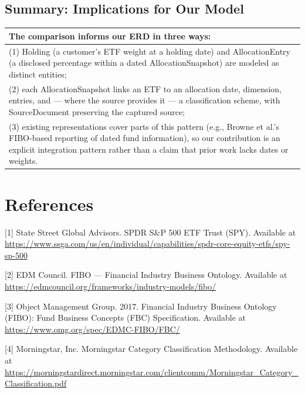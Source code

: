 \documentclass[sigconf]{acmart}
\begin{document}
\subsection{Summary: Implications for Our Model}

\begin{table}[h]
\centering
\begin{tabular}{p{}}
\toprule
The comparison informs our ERD in three ways:\\
\midrule
(1) Holding (a customer's ETF weight at a holding date) and
AllocationEntry (a disclosed percentage within a dated AllocationSnapshot)
are modeled as distinct entities;\\
(2) each AllocationSnapshot links an ETF to an allocation date, dimension,
entries, and --- where the source provides it --- a classification scheme,
with SourceDocument preserving the captured source;\\
(3) existing representations cover parts of this pattern (e.g., Browne et
al.'s FIBO-based reporting of dated fund information), so our contribution
is an explicit integration pattern rather than a claim that prior work
lacks dates or weights.\\
\bottomrule
\end{tabular}
\end{table}

\section{References}


[1] State Street Global Advisors. SPDR S\&P 500 ETF Trust (SPY). Available
at \url{https://www.ssga.com/us/en/individual/capabilities/spdr-core-equity-etfs/spy-sp-500}

[2] EDM Council. FIBO --- Financial Industry Business Ontology. Available
at \url{https://edmcouncil.org/frameworks/industry-models/fibo/}

[3] Object Management Group. 2017. Financial Industry Business Ontology
(FIBO): Fund Business Concepts (FBC) Specification. Available at
\url{https://www.omg.org/spec/EDMC-FIBO/FBC/}

[4] Morningstar, Inc. Morningstar Category Classification Methodology.
Available at
\url{https://morningstardirect.morningstar.com/clientcomm/Morningstar_Category_Classification.pdf}
\end{document}

